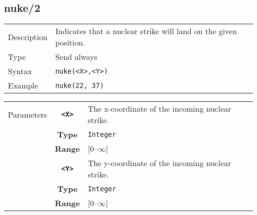 \subsection{nuke/2}
\begin{tabularx}{\textwidth}{lX}
 Description & Indicates that a nuclear strike will land on the given position. \\
 Type & Send always \\
 Syntax & \verb|nuke(<X>,<Y>)| \\
 Example & \verb|nuke(22, 37)|   \\
 \end{tabularx}
 \begin{tabularx}{\textwidth}{l | c | p{8cm}|}
 \cline{2-3}
 Parameters & \textbf{\verb|<X>|} & The x-coordinate of the incoming nuclear strike.\\
            & \textbf{Type} & \verb|Integer| \\
            &\textbf{Range} &  [0--$\infty$] \\
            \cline{2-3}
            & \textbf{\verb|<Y>|} & The y-coordinate of the incoming nuclear strike.\\
            & \textbf{Type} & \verb|Integer| \\
            &\textbf{Range} & [0--$\infty$] \\
            \cline{2-3}
\end{tabularx}

